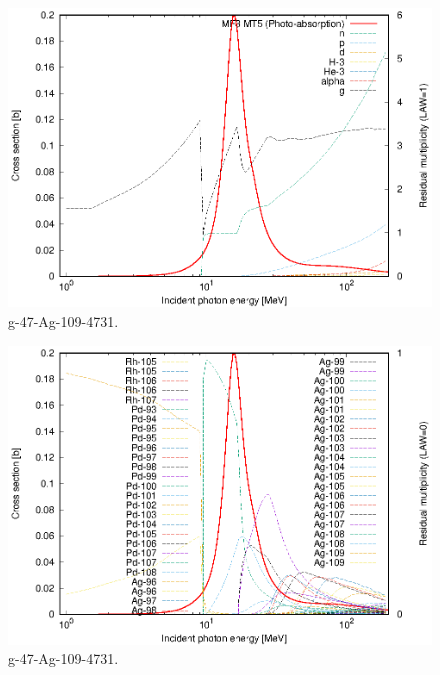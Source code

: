 \begin{figure}
 \includegraphics[width=\linewidth]{eps/g_47-Ag-109_4731.eps}
  \caption{g-47-Ag-109-4731.}
\end{figure}
\begin{figure}
 \includegraphics[width=\linewidth]{eps-law0/g_47-Ag-109_4731.eps}
 \caption{g-47-Ag-109-4731.}
\end{figure}
\newpage \clearpage

